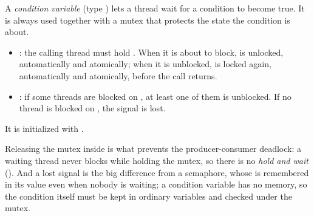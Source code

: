 \begin{definition}
  A \emph{condition variable} (type ) lets a thread wait for a condition to become true. It is always used together with a mutex that protects the state the condition is about.
  \begin{itemize}
    \item {}: the calling thread must hold . When it is about to block,  is unlocked, automatically and atomically; when it is unblocked,  is locked again, automatically and atomically, before the call returns.
    \item {}: if some threads are blocked on , at least one of them is unblocked. If no thread is blocked on , the signal is lost.
  \end{itemize}
  It is initialized with .
\end{definition}

Releasing the mutex inside  is what prevents the producer-consumer deadlock: a waiting thread never blocks while holding the mutex, so there is no \emph{hold and wait} (). And a lost signal is the big difference from a semaphore, whose  is remembered in its value even when nobody is waiting; a condition variable has no memory, so the condition itself must be kept in ordinary variables and checked under the mutex.

